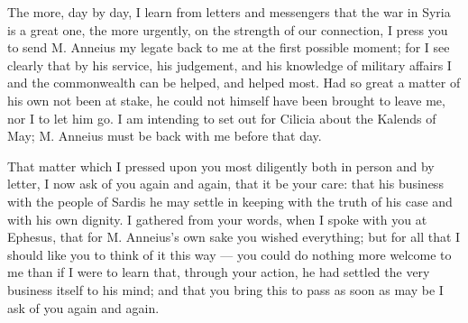 

 The more, day by day, I learn from letters and messengers that the war in Syria is a great one, the more urgently, on the strength of our connection, I press you to send M. Anneius my legate back to me at the first possible moment; for I see clearly that by his service, his judgement, and his knowledge of military affairs I and the commonwealth can be helped, and helped most. Had so great a matter of his own not been at stake, he could not himself have been brought to leave me, nor I to let him go. I am intending to set out for Cilicia about the Kalends of May; M. Anneius must be back with me before that day.

 That matter which I pressed upon you most diligently both in person and by letter, I now ask of you again and again, that it be your care: that his business with the people of Sardis he may settle in keeping with the truth of his case and with his own dignity. I gathered from your words, when I spoke with you at Ephesus, that for M. Anneius's own sake you wished everything; but for all that I should like you to think of it this way --- you could do nothing more welcome to me than if I were to learn that, through your action, he had settled the very business itself to his mind; and that you bring this to pass as soon as may be I ask of you again and again.
